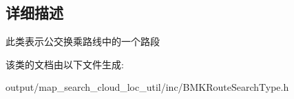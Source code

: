 \subsection{详细描述}
此类表示公交换乘路线中的一个路段 

该类的文档由以下文件生成\+:\begin{DoxyCompactItemize}
\item 
output/map\+\_\+search\+\_\+cloud\+\_\+loc\+\_\+util/inc/B\+M\+K\+Route\+Search\+Type.\+h\end{DoxyCompactItemize}
